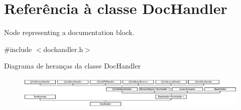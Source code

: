 \hypertarget{class_doc_handler}{\section{Referência à classe Doc\-Handler}
\label{class_doc_handler}
}


Node representing a documentation block.  




{\ttfamily \#include $<$dochandler.\-h$>$}

Diagrama de heranças da classe Doc\-Handler\begin{figure}[H]
\begin{center}
\leavevmode
\includegraphics[height=1.600000cm]{class_doc_handler}
\end{center}
\end{figure}
